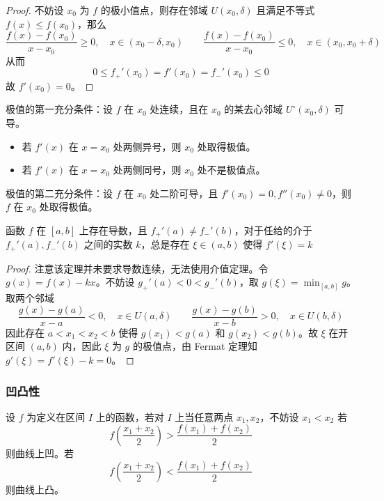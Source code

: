 \begin{proof}
	不妨设 $x_0$ 为 $f$ 的极小值点，则存在邻域 $U(x_0, \delta)$ 且满足不等式 $f(x) \leqslant f(x_0)$，那么
	\[ \frac{f(x) - f(x_0)}{x - x_0} \geqslant 0, \quad x \in (x_0 - \delta, x_0) \qquad
		\frac{f(x) - f(x_0)}{x - x_0} \leqslant 0, \quad x \in (x_0, x_0 + \delta) \]
	从而
	\[ 0 \leqslant f_+'(x_0) = f'(x_0) = f_-'(x_0) \leqslant 0 \]
	故 $f'(x_0) = 0$。
\end{proof}

极值的第一充分条件：设 $f$ 在 $x_0$ 处连续，且在 $x_0$ 的某去心邻域 $U^\circ(x_0, \delta)$ 可导。
\begin{itemize}
	\item 若 $f'(x)$ 在 $x=x_0$ 处两侧异号，则 $x_0$ 处取得极值。
	\item 若 $f'(x)$ 在 $x=x_0$ 处两侧同号，则 $x_0$ 处不是极值点。
\end{itemize}

极值的第二充分条件：设 $f$ 在 $x_0$ 处二阶可导，且 $f'(x_0) = 0, f''(x_0) \neq 0$，则 $f$ 在 $x_0$ 处取得极值。

\begin{theorem}[Darboux 定理]
	函数 $f$ 在 $[a, b]$ 上存在导数，且 $f_{+}'(a) \neq f_{-}'(b)$，对于任给的介于 $f_{+}'(a), f_{-}'(b)$ 之间的实数 $k$，总是存在 $\xi \in (a, b)$ 使得 $f'(\xi) = k$
\end{theorem}

\begin{proof}
	注意该定理并未要求导数连续，无法使用介值定理。令 $g(x) = f(x) - kx$。不妨设 $g_{+}'(a) < 0 < g_{-}'(b)$，取 $g(\xi) = \min_{[a, b]} g$。取两个邻域
	\[ \frac{g(x) - g(a)}{x - a} < 0, \quad x \in U(a, \delta) \qquad
		\frac{g(x) - g(b)}{x - b} > 0, \quad x \in U(b, \delta) \]
	因此存在 $a < x_1 < x_2 < b$ 使得 $g(x_1) < g(a)$ 和 $g(x_2) < g(b)$。故 $\xi$ 在开区间 $(a, b)$ 内，因此 $\xi$ 为 $g$ 的极值点，由 Fermat 定理知 $g'(\xi) = f'(\xi) - k = 0$。
\end{proof}

\subsubsection*{凹凸性}

\begin{definition}[凹凸性]
	设 $f$ 为定义在区间 $I$ 上的函数，若对 $I$ 上当任意两点 $x_1,x_2$，不妨设 $x_1 < x_2$ 若
	\[ f\left(\frac{x_1+x_2}{2}\right) > \frac{f(x_1)+f(x_2)}{2} \]
	则曲线上凹。若
	\[ f\left(\frac{x_1+x_2}{2}\right) < \frac{f(x_1)+f(x_2)}{2} \]
	则曲线上凸。
\end{definition}

